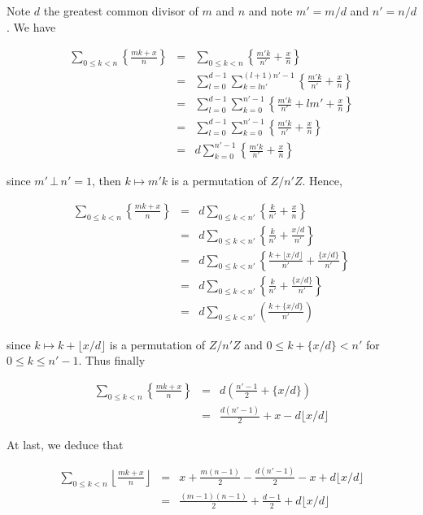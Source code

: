 \documentclass[a4paper,12pt]{article}
\begin{document}
Note $d$ the greatest common divisor of $m$ and $n$ and note $m' =
m/d$ and $n' = n/d$.  We have

\begin{eqnarray*}
  \sum_{0\le k<n}\left\{ \frac{mk+x}{n} \right\} &=& \sum_{0\le k<n}
  \left\{ \frac{m'k}{n'} + \frac{x}{n} \right\} \\
  &=& \sum_{l=0}^{d-1} \sum_{k=ln'}^{(l+1)n'-1}\left\{ \frac{m'k}{n'}
  + \frac{x}{n} \right\} \\
  &=& \sum_{l=0}^{d-1} \sum_{k=0}^{n'-1} \left\{ \frac{m'k}{n'} + lm'
  + \frac{x}{n} \right\} \\
  &=& \sum_{l=0}^{d-1}\sum_{k=0}^{n'-1} \left\{ \frac{m'k}{n'} +
  \frac{x}{n} \right\} \\
  &=& d \sum_{k=0}^{n'-1}\left\{ \frac{m'k}{n'} + \frac{x}{n} \right\}
\end{eqnarray*}

since $m'\,\bot\,n' = 1$, then $k \mapsto m'k$ is a permutation of
$Z/n'Z$.  Hence,

\begin{eqnarray*}
  \sum_{0\le k<n}\left\{ \frac{mk+x}{n}\right\} &=&
  d \sum_{0\le k <n'}\left\{ \frac{k}{n'} + \frac{x}{n}\right\} \\ &=&
  d \sum_{0\le k<n'} \left\{ \frac{k}{n'} + \frac{x/d}{n'}\right\}
  \\ &=& d \sum_{0\le k<n'}\left\{ \frac{k + \lfloor x/d\rfloor}{n'} +
  \frac{\{ x/d \}}{n'}\right\} \\ &=&
  d \sum_{0\le k<n'}\left\{ \frac{k}{n'} + \frac{\{x/d\}}{n'} \right\}
  \\ &=& d \sum_{0\le k<n'} \left( \frac{k + \{x/d\}}{n'} \right)
\end{eqnarray*}

since $k \mapsto k + \lfloor x/d\rfloor$ is a permutation of $Z/n'Z$
and $0 \le k + \{x/d\} < n'$ for $0\le k \le n'-1$.  Thus finally

\begin{eqnarray*}
  \sum_{0\le k<n}\left\{ \frac{mk+x}{n} \right\} &=&
  d \left( \frac{n'-1}{2} + \{x/d\} \right) \\ &=&
  \frac{d(n'-1)}{2} + x - d \lfloor x/d\rfloor
\end{eqnarray*}

At last, we deduce that

\begin{eqnarray*}
  \sum_{0\le k<n}\left\lfloor \frac{mk+x}{n} \right\rfloor &=& x +
  \frac{m(n-1)}{2} - \frac{d(n'-1)}{2} - x + d \lfloor x/d\rfloor
  \\ &=& \frac{(m-1)(n-1)}{2} + \frac{d-1}{2} + d \lfloor x/d\rfloor
\end{eqnarray*}
\end{document}
